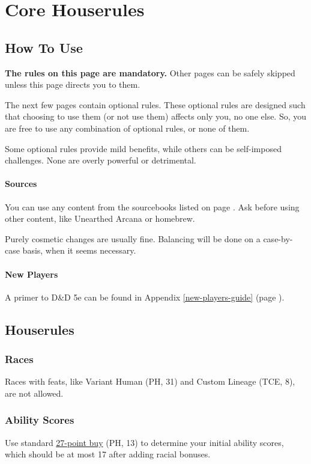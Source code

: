 \documentclass[letterpaper,twocolumn,openany,nodeprecatedcode,bg=print]{dndbook}
\newcommand{\pg}[1]{page \pageref{#1}}
\begin{document}




\chapter{Core Houserules}

\noindent [Version 8.0.0]

\section{How To Use}
\textbf{The rules on this page are mandatory.}
Other pages can be safely skipped unless this page directs you to them.

The next few pages contain optional rules. These optional rules are designed such that choosing to use them (or not use them) affects only you, no one else. 
So, you are free to use any combination of optional rules, or none of them.

Some optional rules provide mild benefits, while others can be self-imposed challenges. 
None are overly powerful or detrimental. 

\subsubsection{Sources}
You can use any content from the sourcebooks listed on \pg{sources}. 
Ask before using other content, like Unearthed Arcana or homebrew. 

Purely cosmetic changes are usually fine. Balancing will be done on a case-by-case basis, when it seems necessary. 

\subsubsection{New Players}
A primer to D\&D 5e can be found in Appendix \ref{new-players-guide} (\pg{new-players-guide}).

\newpage
\section{Houserules}

\subsection{Races}
Races with feats, like Variant Human (PH, 31) and Custom Lineage (TCE, 8), are not allowed.

\subsection{Ability Scores}
Use standard \href{https://chicken-dinner.com/5e/5e-point-buy.html}{27-point buy} (PH, 13) to determine your initial ability scores, which should be at most 17 after adding racial bonuses.
\end{document}
